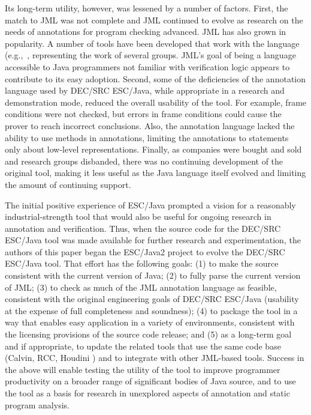 \documentclass{sig-alternate}
\begin{document}
Its long-term utility, however, was lessened by a number of factors.
First, the match to JML was not complete and JML continued to evolve
as research on the needs of annotations for program checking advanced.
JML has also grown in
popularity.  A number of tools have been developed that work with the language (e.g.,~\cite{jmlpapers,Bogor03,NimmerErnst01Leavens-etal00},
representing the work of several groups.  JML's goal of being a language
accessible to Java programmers not familiar with verification logic appears to
contribute to its easy adoption.   
Second, some of the deficiencies of the annotation language used by
DEC/SRC ESC/Java, while appropriate in a research 
and demonstration mode, reduced the
overall usability of the tool.  For example, frame conditions were not
checked, but errors in frame conditions could cause the prover to
reach incorrect conclusions.  Also, the annotation language lacked the
ability to use methods in annotations, limiting the annotations to
statements only about low-level representations.  Finally, as
companies were bought and sold and research groups disbanded, there
was no continuing development of the original tool, making it
less useful as the Java language itself evolved and limiting the
amount of continuing support.

The initial positive experience of ESC/Java prompted a vision for a
reasonably industrial-strength tool that would also be useful for
ongoing research in annotation and verification.  Thus, when the
source code for the DEC/SRC ESC/Java tool was made available for
further research and experimentation, the authors of this paper began
the ESC/Java2 project to evolve the DEC/SRC ESC/Java tool.  That
effort has the following goals:
(1) to make the source consistent with the current version of Java;
(2) to fully parse the current version of JML;
(3) to check as much of the JML annotation language as feasible,
consistent with the original engineering goals of DEC/SRC ESC/Java
(usability at the expense of full completeness and soundness); 
(4) to package the tool in a way that enables easy application in a
variety of environments, consistent with the licensing provisions of
the source code release;
and
(5) as a long-term goal and if appropriate, to update the related
tools that use the same code base (Calvin, RCC, Houdini \cite{flanagan01houdini}) and to
integrate with other JML-based tools.  Success in the above will
enable testing the utility of the tool to improve programmer
productivity on a broader range of significant bodies of Java source,
and to use the tool as a basis for research in unexplored aspects of
annotation and static program analysis.
  
\end{document}
